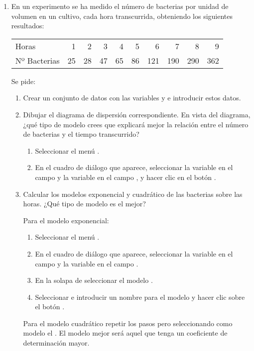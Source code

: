 \begin{enumerate}[leftmargin=*]
\item En un experimento se ha medido el número de bacterias por unidad de volumen en un cultivo, cada hora transcurrida,
obteniendo los siguientes resultados:
\begin{center}
\begin{tabular}{lrrrrrrrrr}
\hline
Horas & 1 & 2 & 3 & 4 & 5 & 6 & 7 & 8 & 9 \\
Nº Bacterias & 25 & 28 & 47 & 65 & 86 & 121 & 190 & 290 & 362\\
\hline
\end{tabular}
\end{center}

Se pide:
\begin{enumerate}
\item Crear un conjunto de datos con las variables  y  e introducir estos datos.

\item Dibujar el diagrama de dispersión correspondiente. En vista del diagrama, ¿qué tipo de modelo crees que explicará
mejor la relación entre el número de bacterias y el tiempo transcurrido? 
\begin{indicacion}
\begin{enumerate}
\item Seleccionar el menú .
\item En el cuadro de diálogo que aparece, seleccionar la variable  en el campo 
y la variable  en el campo , y hacer clic en el botón .
\end{enumerate}
\end{indicacion}

\item Calcular los modelos exponencial y cuadrático de las bacterias sobre las horas. ¿Qué tipo de modelo es el mejor?
\begin{indicacion}
Para el modelo exponencial:
\begin{enumerate}
\item Seleccionar el menú .
\item En el cuadro de diálogo que aparece, seleccionar la variable  en el campo  y la variable  en el campo .
\item En la solapa de  seleccionar el modelo .
\item Seleccionar  e introducir un nombre para el modelo y hacer clic sobre el botón .
\end{enumerate}
Para el modelo cuadrático repetir los pasos pero seleccionando como modelo el . 
El modelo mejor será aquel que tenga un coeficiente de determinación mayor.
\end{indicacion}


\end{enumerate}
\end{enumerate}
